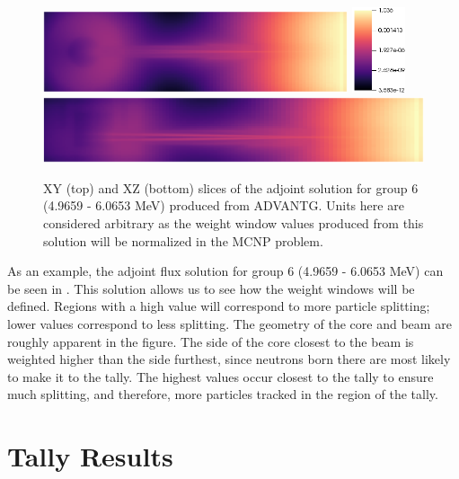 \begin{figure}[htb]
\centering
\includegraphics[width=0.8\textwidth]{tex/figures/advantgxy.png} \includegraphics[width=0.14\textwidth]{tex/figures/advantg_legend.png}\\
\includegraphics[width=\textwidth]{tex/figures/advantgxz.png}\\
\caption[ADVANTG Solution]{XY (top) and XZ (bottom) slices of the adjoint solution for group 6 (4.9659 - 6.0653 MeV) produced from ADVANTG. Units here are considered arbitrary as the weight window values produced from this solution will be normalized in the MCNP problem.}
\label{fig:advantg}
\end{figure}


As an example, the adjoint flux solution for group 6 (4.9659 - 6.0653 MeV) can be seen in .
This solution allows us to see how the weight windows will be defined.
Regions with a high value will correspond to more particle splitting; lower values correspond to less splitting.
The geometry of the core and beam are roughly apparent in the figure.
The side of the core closest to the beam is weighted higher than the side furthest, since neutrons born there are most likely to make it to the tally.
The highest values occur closest to the tally to ensure much splitting, and therefore, more particles tracked in the region of the tally.

\section{Tally Results}

